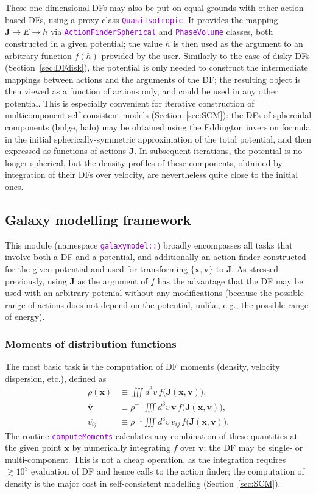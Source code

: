 \documentclass[12pt]{article}
\newcommand{\ttt}[1]{\textcolor{darkviolet}{\texttt{#1}}}
\newcommand{\bv}{\boldsymbol{v}}
\newcommand{\bx}{\boldsymbol{x}}
\newcommand{\bJ}{\boldsymbol{J}}
\begin{document}
These one-dimensional DFs may also be put on equal grounds with other action-based DFs, using a proxy class \ttt{QuasiIsotropic}. It provides the mapping $\bJ \to E \to h$ via \ttt{ActionFinderSpherical} and \ttt{PhaseVolume} classes, both constructed in a given potential; the value $h$ is then used as the argument to an arbitrary function $f(h)$ provided by the user. Similarly to the case of disky DFs (Section~\ref{sec:DFdisk}), the potential is only needed to construct the intermediate mappings between actions and the arguments of the DF; the resulting object is then viewed as a function of actions only, and could be used in any other potential.
This is especially convenient for iterative construction of multicomponent self-consistent models (Section~\ref{sec:SCM}): the DFs of spheroidal components (bulge, halo) may be obtained using the Eddington inversion formula in the initial spherically-symmetric approximation of the total potential, and then expressed as functions of actions $\bJ$. In subsequent iterations, the potential is no longer spherical, but the density profiles of these components, obtained by integration of their DFs over velocity, are nevertheless quite close to the initial ones.

\subsection{Galaxy modelling framework}  \label{sec:GalaxyModel}

This module (namespace \ttt{galaxymodel::}) broadly encompasses all tasks that involve both a DF and a potential, and additionally an action finder constructed for the given potential and used for transforming $\{\bx,\bv\}$ to $\bJ$.
As stressed previously, using $\bJ$ as the argument of $f$ has the advantage that the DF may be used with an arbitrary potenial without any modifications (because the possible range of actions does not depend on the potential, unlike, e.g., the possible range of energy).

\subsubsection{Moments of distribution functions}  \label{sec:Moments}

The most basic task is the computation of DF moments (density, velocity dispersion, etc.), defined as
\begin{align*}
\rho(\bx) &\equiv \iiint d^3v\, f\big(\bJ(\bx,\bv)\big), \\
\overline{\bv} &\equiv \rho^{-1} \iiint d^3v \,\bv\, f\big(\bJ(\bx,\bv)\big), \\
\overline{v_{ij}} &\equiv \rho^{-1} \iiint d^3v \,v_{ij}\, f\big(\bJ(\bx,\bv)\big).
\end{align*}
The routine \ttt{computeMoments} calculates any combination of these quantities at the given point $\bx$ by numerically integrating $f$ over $\bv$; the DF may be single- or multi-component. 
This is not a cheap operation, as the integration requires $\gtrsim 10^3$ evaluation of DF and hence calls to the action finder; the computation of density is the major cost in self-consistent modelling (Section~\ref{sec:SCM}).
\end{document}
